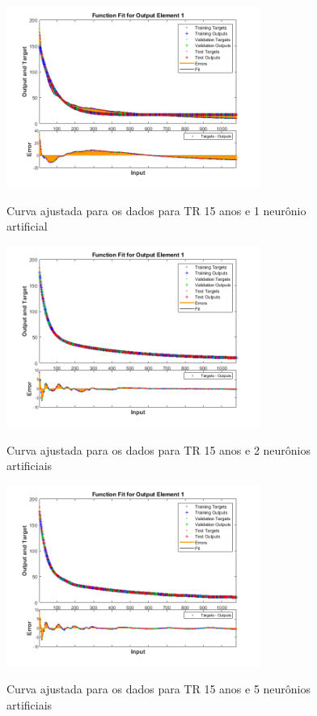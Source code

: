 \begin{figure}[H]
    \caption{Curva ajustada para os dados para TR 15 anos e 1 neurônio artificial}
    \centering
    \includegraphics[width=0.74\textwidth]{Textuais/Figuras/NN/tr15-1neuronio.png}
    \label{fig:tr15-1n}
\end{figure}

\begin{figure}[H]
    \caption{Curva ajustada para os dados para TR 15 anos e 2 neurônios artificiais}
    \centering
    \includegraphics[width=0.74\textwidth]{Textuais/Figuras/NN/tr15-2neuronio.png}
    \label{fig:tr15-2n}
\end{figure}

\begin{figure}[H]
    \caption{Curva ajustada para os dados para TR 15 anos e 5 neurônios artificiais}
    \centering
    \includegraphics[width=0.74\textwidth]{Textuais/Figuras/NN/tr15-5neuronio.png}
    \label{fig:tr15-5n}
\end{figure}

